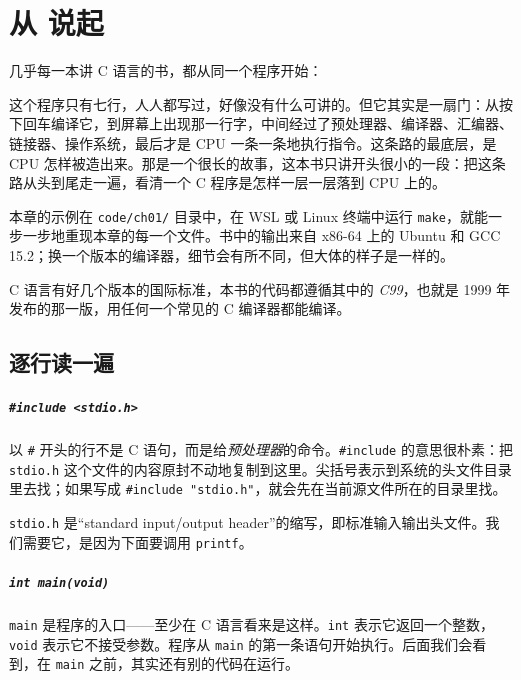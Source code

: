 \chapter{从 \texorpdfstring{}{Hello, world} 说起}
\label{chap:hello}

几乎每一本讲 C 语言的书，都从同一个程序开始：

这个程序只有七行，人人都写过，好像没有什么可讲的。但它其实是一扇门：从按下回车编译它，到屏幕上出现那一行字，中间经过了预处理器、编译器、汇编器、链接器、操作系统，最后才是 CPU 一条一条地执行指令。这条路的最底层，是 CPU 怎样被造出来。那是一个很长的故事，这本书只讲开头很小的一段：把这条路从头到尾走一遍，看清一个 C 程序是怎样一层一层落到 CPU 上的。

本章的示例在 \texttt{code/ch01/} 目录中，在 WSL 或 Linux 终端中运行 \texttt{make}，就能一步一步地重现本章的每一个文件。书中的输出来自 x86-64 上的 Ubuntu 和 GCC 15.2；换一个版本的编译器，细节会有所不同，但大体的样子是一样的。

C 语言有好几个版本的国际标准，本书的代码都遵循其中的 \emph{C99}，也就是 1999 年发布的那一版，用任何一个常见的 C 编译器都能编译。

\section{逐行读一遍}

\paragraph{\texttt{\#include <stdio.h>}}
以 \texttt{\#} 开头的行不是 C 语句，而是给\emph{预处理器}的命令。\texttt{\#include} 的意思很朴素：把 \texttt{stdio.h} 这个文件的内容原封不动地复制到这里。尖括号表示到系统的头文件目录里去找；如果写成 \texttt{\#include "stdio.h"}，就会先在当前源文件所在的目录里找。

\texttt{stdio.h} 是“standard input/output header”的缩写，即标准输入输出头文件。我们需要它，是因为下面要调用 \texttt{printf}。

\paragraph{\texttt{int main(void)}}
\texttt{main} 是程序的入口——至少在 C 语言看来是这样。\texttt{int} 表示它返回一个整数，\texttt{void} 表示它不接受参数。程序从 \texttt{main} 的第一条语句开始执行。后面我们会看到，在 \texttt{main} 之前，其实还有别的代码在运行。

